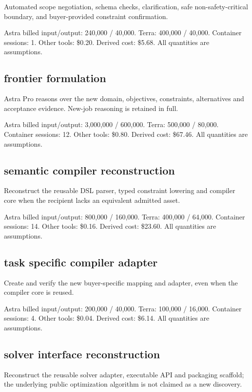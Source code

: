 \documentclass[10pt]{article}
\newcommand{\usd}[1]{\$#1}
\begin{document}
Automated scope negotiation, schema checks, clarification, safe non-safety-critical boundary, and buyer-provided constraint confirmation.

Astra billed input/output: 240,000 / 40,000. Terra: 400,000 / 40,000. Container sessions: 1. Other tools: \usd{0.20}. Derived cost: \usd{5.68}. All quantities are assumptions.

\subsection*{frontier formulation}

Astra Pro reasons over the new domain, objectives, constraints, alternatives and acceptance evidence. New-job reasoning is retained in full.

Astra billed input/output: 3,000,000 / 600,000. Terra: 500,000 / 80,000. Container sessions: 12. Other tools: \usd{0.80}. Derived cost: \usd{67.46}. All quantities are assumptions.

\subsection*{semantic compiler reconstruction}

Reconstruct the reusable DSL parser, typed constraint lowering and compiler core when the recipient lacks an equivalent admitted asset.

Astra billed input/output: 800,000 / 160,000. Terra: 400,000 / 64,000. Container sessions: 14. Other tools: \usd{0.16}. Derived cost: \usd{23.60}. All quantities are assumptions.

\subsection*{task specific compiler adapter}

Create and verify the new buyer-specific mapping and adapter, even when the compiler core is reused.

Astra billed input/output: 200,000 / 40,000. Terra: 100,000 / 16,000. Container sessions: 4. Other tools: \usd{0.04}. Derived cost: \usd{6.14}. All quantities are assumptions.

\subsection*{solver interface reconstruction}

Reconstruct the reusable solver adapter, executable API and packaging scaffold; the underlying public optimization algorithm is not claimed as a new discovery.
\end{document}

